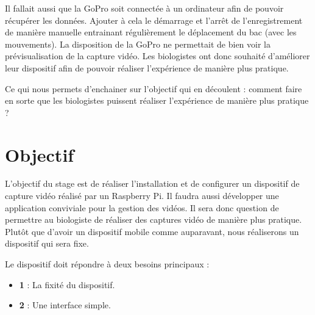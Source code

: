         \vspace{0.2cm}
        
        Il fallait aussi que la GoPro soit connectée à un ordinateur afin de pouvoir récupérer les données.
        Ajouter à cela le démarrage et l'arrêt de l'enregistrement de manière manuelle entrainant régulièrement le déplacement du bac (avec les mouvements). La disposition de la GoPro ne permettait de bien voir la prévisualisation de la capture vidéo.
        Les biologistes ont donc souhaité d'améliorer leur dispositif afin de pouvoir réaliser l'expérience de manière plus pratique.

        \vspace{0.2cm}

        Ce qui nous permets d'enchainer sur l'objectif qui en découlent : comment faire en sorte que les biologistes puissent réaliser l'expérience de manière plus pratique ?

    

    \vspace{0.1cm}


    \section{Objectif}
        L’objectif du stage est de réaliser l’installation et de configurer un dispositif de capture vidéo réalisé par un Raspberry Pi. Il faudra aussi développer une application conviviale pour la gestion des vidéos.
        Il sera donc question de permettre au biologiste de réaliser des captures vidéo de manière plus pratique.
        Plutôt que d'avoir un dispositif mobile comme auparavant, nous réaliserons un dispositif qui sera fixe.

        \vspace{0.2cm}


        \begin{flushleft}
            Le dispositif doit répondre à deux besoins principaux :
            \begin{itemize}            
                \item \textbf{1} : La fixité du dispositif.
                \item \textbf{2} : Une interface simple.
            \end{itemize}
        \end{flushleft}
                    
